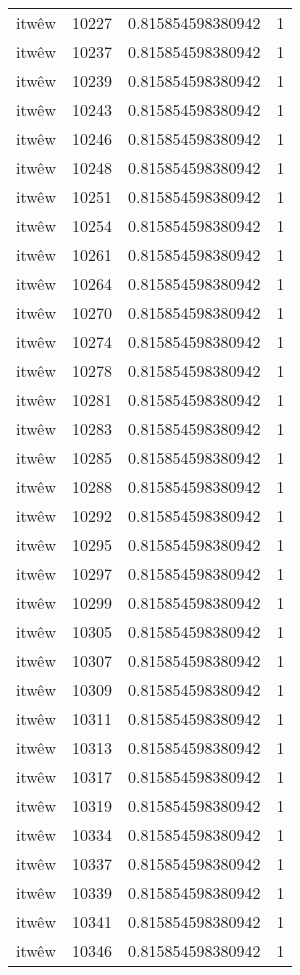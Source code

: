 \begin{longtable}{llll}
itwêw & 10227 & 0.815854598380942 & 1 \\
itwêw & 10237 & 0.815854598380942 & 1 \\
itwêw & 10239 & 0.815854598380942 & 1 \\
itwêw & 10243 & 0.815854598380942 & 1 \\
itwêw & 10246 & 0.815854598380942 & 1 \\
itwêw & 10248 & 0.815854598380942 & 1 \\
itwêw & 10251 & 0.815854598380942 & 1 \\
itwêw & 10254 & 0.815854598380942 & 1 \\
itwêw & 10261 & 0.815854598380942 & 1 \\
itwêw & 10264 & 0.815854598380942 & 1 \\
itwêw & 10270 & 0.815854598380942 & 1 \\
itwêw & 10274 & 0.815854598380942 & 1 \\
itwêw & 10278 & 0.815854598380942 & 1 \\
itwêw & 10281 & 0.815854598380942 & 1 \\
itwêw & 10283 & 0.815854598380942 & 1 \\
itwêw & 10285 & 0.815854598380942 & 1 \\
itwêw & 10288 & 0.815854598380942 & 1 \\
itwêw & 10292 & 0.815854598380942 & 1 \\
itwêw & 10295 & 0.815854598380942 & 1 \\
itwêw & 10297 & 0.815854598380942 & 1 \\
itwêw & 10299 & 0.815854598380942 & 1 \\
itwêw & 10305 & 0.815854598380942 & 1 \\
itwêw & 10307 & 0.815854598380942 & 1 \\
itwêw & 10309 & 0.815854598380942 & 1 \\
itwêw & 10311 & 0.815854598380942 & 1 \\
itwêw & 10313 & 0.815854598380942 & 1 \\
itwêw & 10317 & 0.815854598380942 & 1 \\
itwêw & 10319 & 0.815854598380942 & 1 \\
itwêw & 10334 & 0.815854598380942 & 1 \\
itwêw & 10337 & 0.815854598380942 & 1 \\
itwêw & 10339 & 0.815854598380942 & 1 \\
itwêw & 10341 & 0.815854598380942 & 1 \\
itwêw & 10346 & 0.815854598380942 & 1 \\

\end{longtable}
